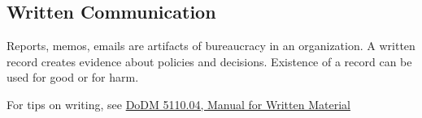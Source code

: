 \subsection{Written Communication\label{sec:written-communication}}

Reports, memos, emails are artifacts of bureaucracy in an organization. A written record creates evidence about policies and decisions. Existence of a record can be used for good or for harm.



For tips on writing, see 
\href{https://www.google.com/search?q=dodm+5110.04}{DoDM 5110.04, Manual for Written Material}